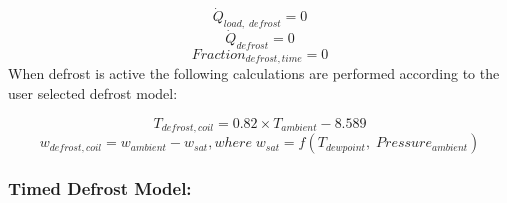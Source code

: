 \begin{equation}
\dot{Q}_{load,\; defrost} = {0}
\end{equation}
\begin{equation}
\dot{Q}_{defrost} = {0}
\end{equation}
\begin{equation}
Fraction_{defrost, time} = {0}
\end{equation}
When defrost is active the following calculations are performed according to the user selected defrost model:

\begin{equation}
T_{defrost, coil} = {0.82 \times T_{ambient} - 8.589}
\end{equation}
\begin{equation}
{w_{defrost, coil} = w_{ambient} - w_{sat}}, where\; {w_{sat} = f(T_{dewpoint},\; Pressure_{ambient})}
\end{equation}

\subsubsection*{Timed Defrost Model:}\label{eir-air-to-water-heat-pumps-timed-defrost}

